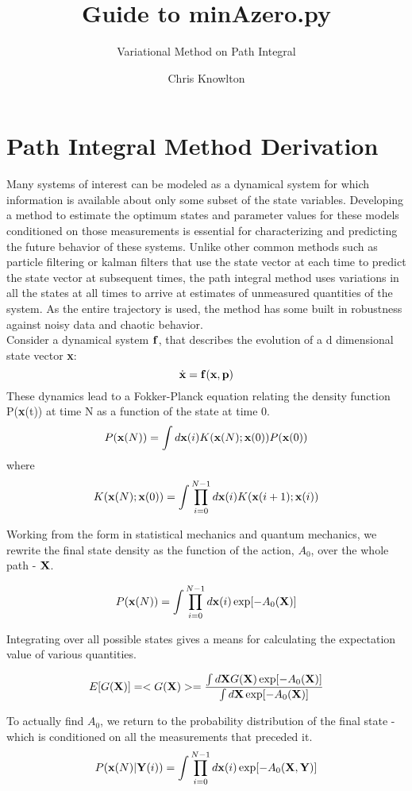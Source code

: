 \documentclass{scrartcl}
\newcommand{\be}{\begin{equation}}
\newcommand{\ee}{\end{equation}}
\def\x{\mbox{{\bf x}}}
\def\Y{\mbox{$\bf{Y}$}}
\def\X{\mbox{$\bf{X}$}}
\def\p{\mbox{$\bf{p}$}}
\def\f{\mbox{$\bf{f}$}}
\begin{document}
\title{Guide to minAzero.py}
\subtitle{Variational Method on Path Integral}
\author{Chris Knowlton}
\maketitle
\section*{Path Integral Method Derivation}

Many systems of interest can be modeled as a dynamical system for which information is available about only some subset of the state variables.  Developing a method to estimate the optimum states and parameter values for these models conditioned on those measurements is essential for characterizing and predicting the future behavior of these systems.  Unlike other common methods such as particle filtering or kalman filters that use the state vector at each time to predict the state vector at subsequent times, the path integral method uses variations in all the states at all times to arrive at estimates of unmeasured quantities of the system.  As the entire trajectory is used, the method has some built in robustness against noisy data and chaotic behavior.
\\

Consider a dynamical system \f , that describes the evolution of a d dimensional state vector \x:
\be
\dot{\x} = \f(\x,\p)
\ee
These dynamics lead to a Fokker-Planck equation relating the density function P(\x(t)) at time N as a function of the state at time 0.
\be
P(\x(N)) = \int d \x(i) K(\x(N);\x(0)) P(\x(0))
\ee
where
\be
K(\x(N);\x(0)) = \int \prod_{i=0}^{N-1} d\x(i) K(\x(i+1); \x(i))
\ee

Working from the form in statistical mechanics and quantum mechanics, we rewrite the final state density as the function of the action, $A_0$, over the whole path - \X.

\be
P(\x(N)) = \int \prod_{i=0}^{N-1} d\x(i) \exp[-A_0(\X)]
\ee

Integrating over all possible states gives a means for calculating the expectation value of various quantities.

\be
E[G(\X)] = < G(\X) > = \frac{\int d\X G(\X) \exp[-A_0(\X)]}{\int d\X \exp[-A_0(\X)]}
\ee

To actually find $A_0$, we return to the probability distribution of the final state - which is conditioned on all the measurements that preceded it.
\be
P(\x(N)|\Y(i)) = \int \prod_{i=0}^{N-1} d\x(i) \exp[-A_0(\X,\Y)]
\ee
\end{document}

